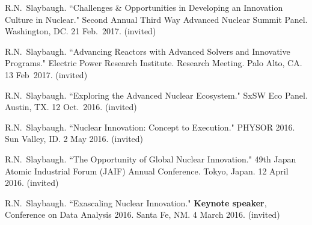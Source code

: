 \begin{bibsection}

\item R.N.\ Slaybaugh. ``Challenges \& Opportunities in Developing an Innovation Culture in Nuclear." Second Annual Third Way Advanced Nuclear Summit Panel. Washington, DC. 21 Feb.\ 2017. (invited)

\item R.N.\ Slaybaugh. ``Advancing Reactors with Advanced Solvers and Innovative Programs." Electric Power Research Institute. Research Meeting. Palo Alto, CA. 13 Feb\ 2017. (invited)

\item R.N.\ Slaybaugh. ``Exploring the Advanced Nuclear Ecosystem." SxSW Eco Panel. Austin, TX. 12 Oct.\ 2016. (invited)




\item R.N.\ Slaybaugh. ``Nuclear Innovation: Concept to Execution." PHYSOR 2016. Sun Valley, ID. 2 May 2016. (invited)


\item R.N.\ Slaybaugh. ``The Opportunity of Global Nuclear Innovation." 49th Japan Atomic Industrial Forum (JAIF) Annual Conference. Tokyo, Japan. 12 April 2016. (invited)

\item R.N.\ Slaybaugh. ``Exascaling Nuclear Innovation." \textbf{Keynote speaker}, Conference on Data Analysis 2016. Santa Fe, NM. 4 March 2016. (invited) 


\end{bibsection}
